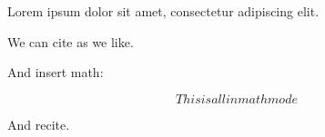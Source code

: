 Lorem ipsum dolor sit amet, consectetur adipiscing elit.

We can cite as we like.\cite{minsky2017perceptrons}

And insert math:

$$This is all in math mode$$

And recite.


